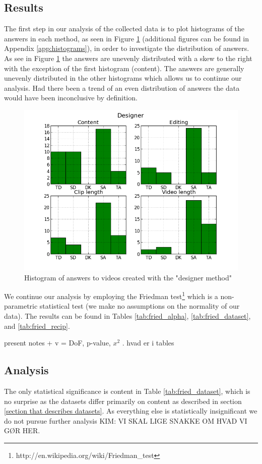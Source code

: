 \subsection{Results}
%
The first step in our analysis of the collected data is to plot histograms of the answers in each method, as seen in Figure \ref{fig:hist_design} (additional figures can be found in Appendix \ref{app:histograms}), in order to investigate the distribution of answers. As see in Figure \ref{fig:hist_design} the answers are unevenly distributed with a skew to the right with the exception of the first histogram (content). The answers are generally unevenly distributed in the other histograms which allows us to continue our analysis. Had there been a trend of an even distribution of answers the data would have been inconclusive by definition.
%
\begin{figure}
     \centering
     \includegraphics[width=1.0\textwidth]{img/designer_barplot.png}
     \caption{Histogram of answers to videos created with the "designer method"}\label{fig:hist_design}
\end{figure}
%
We continue our analysis by employing the Friedman test\footnote{http://en.wikipedia.org/wiki/Friedman\_test} which is a non-parametric statistical test (we make no assumptions on the normality of our data). The results can be found in Tables \ref{tab:fried_alpha}, \ref{tab:fried_dataset}, and \ref{tab:fried_recip}. 
%



%
present notes + v = DoF, p-value, $x^2$ . hvad er i tables %
%
\subsection{Analysis}
%
The only statistical significance is content in Table \ref{tab:fried_dataset}, which is no surprise as the datasets differ primarily on content as described in section \ref{section that describes datasets}. As everything else is statistically insignificant we do not pursue further analysis KIM: VI SKAL LIGE SNAKKE OM HVAD VI GØR HER.
%
